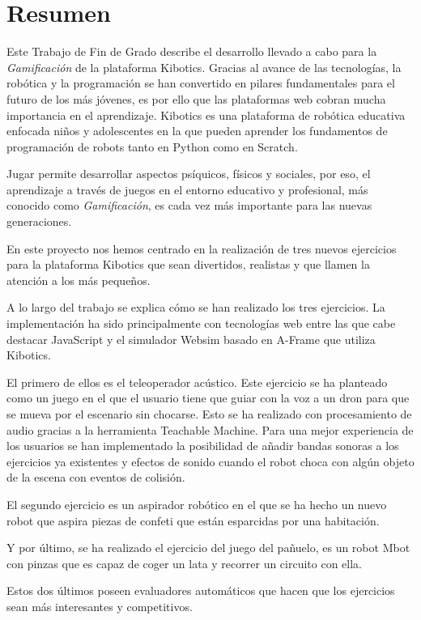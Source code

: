 \newpage
\thispagestyle{plain}			%
\setlength{\parskip}{0pt plus 1.0pt}
\section*{Resumen}
Este Trabajo de Fin de Grado describe el desarrollo llevado a cabo para la \textit{Gamificación} de la plataforma Kibotics.  
Gracias al avance de las tecnologías, la robótica y la programación se han convertido en pilares fundamentales para el futuro de los más jóvenes, es por ello que las plataformas web cobran mucha importancia en el aprendizaje. Kibotics es una plataforma de robótica educativa enfocada niños y adolescentes en la que pueden aprender los fundamentos de programación de robots tanto en Python como en Scratch. 

Jugar permite desarrollar aspectos psíquicos, físicos y sociales, por eso, el aprendizaje a través de juegos en el entorno educativo y profesional, más conocido como \textit{Gamificación}, es cada vez más importante para las nuevas generaciones.
 
En este proyecto nos hemos centrado en la realización de tres nuevos ejercicios para la plataforma Kibotics que sean divertidos, realistas y que llamen la atención a los más pequeños.

A lo largo del trabajo se explica cómo se han realizado los tres ejercicios.  La implementación ha sido principalmente con tecnologías web entre las que cabe destacar JavaScript y el simulador Websim basado en A-Frame que utiliza Kibotics.

El primero de ellos es el teleoperador acústico. Este ejercicio se ha planteado como un juego en el que el usuario tiene que guiar con la voz a un dron para que se mueva por el escenario sin chocarse. Esto se ha realizado con procesamiento de audio gracias a la herramienta Teachable Machine.
Para una mejor experiencia de los usuarios se han implementado la posibilidad de añadir bandas sonoras a los ejercicios ya existentes y efectos de sonido cuando el robot choca con algún objeto de la escena con eventos de colisión.

El segundo ejercicio es un aspirador robótico en el que se ha hecho un nuevo robot que aspira piezas de confeti que están esparcidas por una habitación. 

Y por último, se ha realizado el ejercicio del juego del pañuelo, es un robot Mbot con pinzas que es capaz de coger un lata y recorrer un circuito con ella. 

Estos dos últimos poseen evaluadores automáticos que hacen que los ejercicios sean más interesantes y competitivos.



